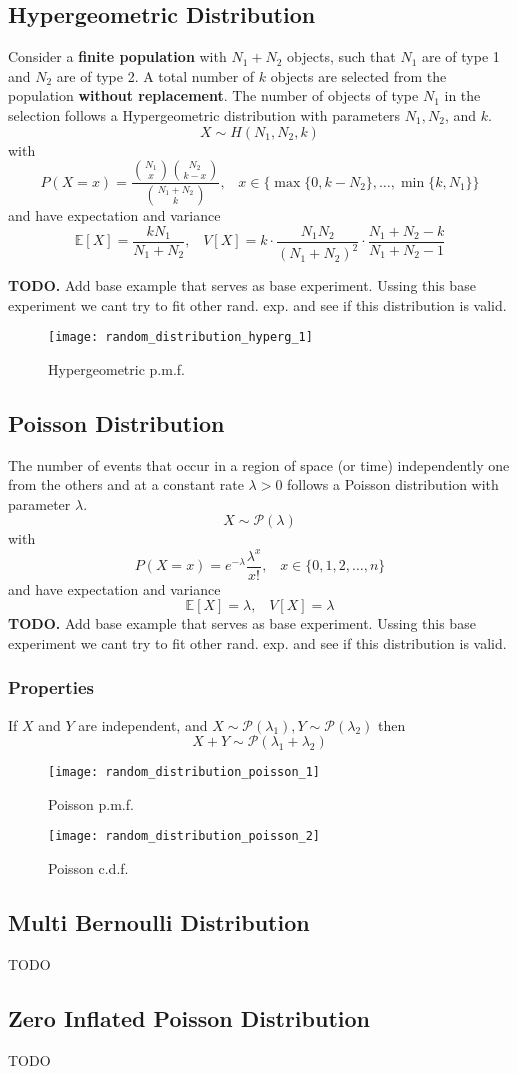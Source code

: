\subsection{Hypergeometric Distribution}
Consider a \textbf{finite population} with $N_1+N_2$ objects, such that $N_1$ are of type 1 and $N_2$ are of type 2. A total number of $k$
objects are selected from the population \textbf{without replacement}. The number of objects of type $N_1$ in the selection follows 
a Hypergeometric distribution with parameters $N_1, N_2$, and $k$.
\[ X \sim H(N_1,N_2,k)\]
with
\[ P(X=x) = \frac{\binom{N_1}{x}\binom{N_2}{k-x}}{\binom{N_1+N_2}{k}},\;\;\; x \in \{\max\{0,k-N_2\},\dots,\min\{k,N_1\} \} \]
and have expectation and variance
\[ \mathbb{E}[X] = \frac{kN_1}{N_1+N_2},\;\;\; V[X] = k\cdot\frac{N_1N_2}{(N_1+N_2)^2}\cdot\frac{N_1+N_2-k}{N_1+N_2-1} \]

\textbf{TODO.} Add base example that serves as base experiment. Ussing this base experiment we cant try to fit other rand. exp. and see
if this distribution is valid.
\begin{figure}[!ht]
    \begin{center}
        \texttt{[image: random\_distribution\_hyperg\_1]}
        \caption{Hypergeometric p.m.f.}
    \end{center}
\end{figure}

\subsection{Poisson Distribution}
The number of events that occur in a region of space (or time) independently one from the others and at a constant rate $\lambda >0$ 
follows a Poisson distribution with parameter $\lambda$.
\[ X \sim \mathcal{P}(\lambda)\]
with
\[ P(X=x) = e^{-\lambda}\frac{\lambda^x}{x!},\;\;\; x \in \{0,1,2,\dots,n\} \]
and have expectation and variance
\[ \mathbb{E}[X] = \lambda,\;\;\; V[X] = \lambda \]
\textbf{TODO.} Add base example that serves as base experiment. Ussing this base experiment we cant try to fit other rand. exp. and see
if this distribution is valid.
\subsubsection{Properties}
If $X$ and $Y$ are independent, and $X \sim \mathcal{P}(\lambda_1), Y \sim \mathcal{P}(\lambda_2)$ then 
\[ X+Y \sim \mathcal{P}(\lambda_1+\lambda_2) \]

\begin{figure}[!ht]
    \begin{minipage}{0.45\linewidth}
      \texttt{[image: random\_distribution\_poisson\_1]}
      \caption{Poisson p.m.f.}
    \end{minipage}
    \hfill
    \begin{minipage}{0.45\linewidth}
      \texttt{[image: random\_distribution\_poisson\_2]}
      \caption{Poisson c.d.f.}
    \end{minipage}
\end{figure}

\subsection{Multi Bernoulli Distribution}
TODO


\subsection{Zero Inflated Poisson Distribution}
TODO
